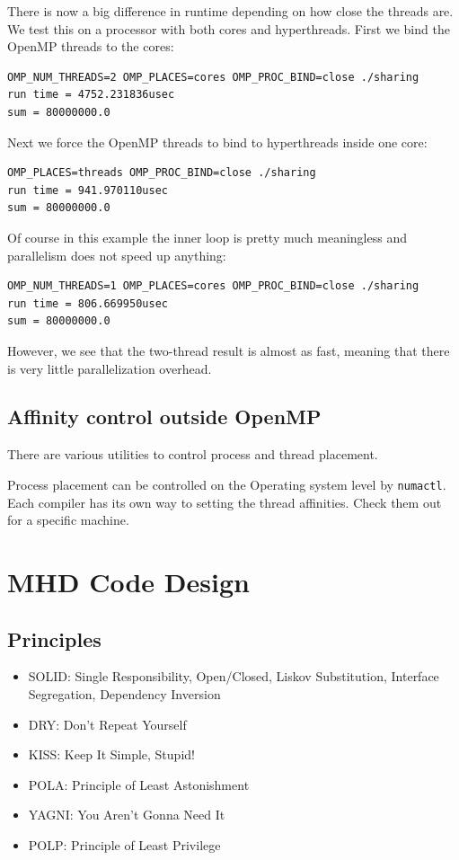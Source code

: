 \documentclass[11pt]{book} %
\begin{document}
There is now a big difference in runtime depending on how close the threads are. We test this on a processor with both cores and hyperthreads. First we bind the OpenMP threads to the cores:
\begin{verbatim}
OMP_NUM_THREADS=2 OMP_PLACES=cores OMP_PROC_BIND=close ./sharing
run time = 4752.231836usec
sum = 80000000.0
\end{verbatim}
Next we force the OpenMP threads to bind to hyperthreads inside one core:
\begin{verbatim}
OMP_PLACES=threads OMP_PROC_BIND=close ./sharing
run time = 941.970110usec
sum = 80000000.0
\end{verbatim}
Of course in this example the inner loop is pretty much meaningless and parallelism does not speed up anything:
\begin{verbatim}
OMP_NUM_THREADS=1 OMP_PLACES=cores OMP_PROC_BIND=close ./sharing
run time = 806.669950usec
sum = 80000000.0
\end{verbatim}
However, we see that the two-thread result is almost as fast, meaning that there is very little parallelization overhead.


\section{Affinity control outside OpenMP}

There are various utilities to control process and thread placement.

Process placement can be controlled on the Operating system level by \verb|numactl|. Each compiler has its own way to setting the thread affinities. Check them out for a specific machine.


\chapter{MHD Code Design}

\section{Principles}

\begin{itemize}
\item SOLID: Single Responsibility, Open/Closed, Liskov Substitution, Interface Segregation, Dependency Inversion
\item DRY: Don't Repeat Yourself
\item KISS: Keep It Simple, Stupid!
\item POLA: Principle of Least Astonishment
\item YAGNI: You Aren't Gonna Need It
\item POLP: Principle of Least Privilege
\end{itemize}
\end{document}
